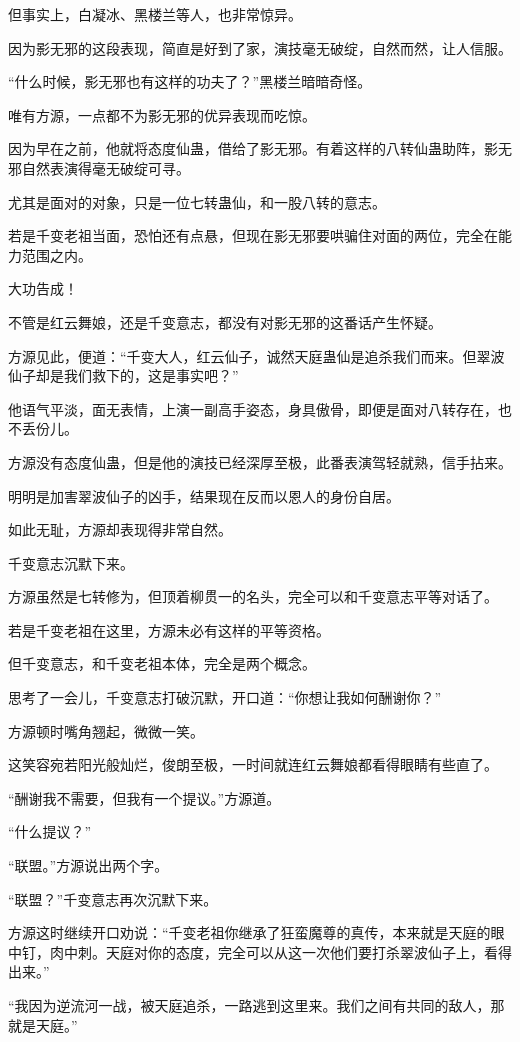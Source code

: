 \begin{this_body}
但事实上，白凝冰、黑楼兰等人，也非常惊异。

因为影无邪的这段表现，简直是好到了家，演技毫无破绽，自然而然，让人信服。

“什么时候，影无邪也有这样的功夫了？”黑楼兰暗暗奇怪。

唯有方源，一点都不为影无邪的优异表现而吃惊。

因为早在之前，他就将态度仙蛊，借给了影无邪。有着这样的八转仙蛊助阵，影无邪自然表演得毫无破绽可寻。

尤其是面对的对象，只是一位七转蛊仙，和一股八转的意志。

若是千变老祖当面，恐怕还有点悬，但现在影无邪要哄骗住对面的两位，完全在能力范围之内。

大功告成！

不管是红云舞娘，还是千变意志，都没有对影无邪的这番话产生怀疑。

方源见此，便道：“千变大人，红云仙子，诚然天庭蛊仙是追杀我们而来。但翠波仙子却是我们救下的，这是事实吧？”

他语气平淡，面无表情，上演一副高手姿态，身具傲骨，即便是面对八转存在，也不丢份儿。

方源没有态度仙蛊，但是他的演技已经深厚至极，此番表演驾轻就熟，信手拈来。

明明是加害翠波仙子的凶手，结果现在反而以恩人的身份自居。

如此无耻，方源却表现得非常自然。

千变意志沉默下来。

方源虽然是七转修为，但顶着柳贯一的名头，完全可以和千变意志平等对话了。

若是千变老祖在这里，方源未必有这样的平等资格。

但千变意志，和千变老祖本体，完全是两个概念。

思考了一会儿，千变意志打破沉默，开口道：“你想让我如何酬谢你？”

方源顿时嘴角翘起，微微一笑。

这笑容宛若阳光般灿烂，俊朗至极，一时间就连红云舞娘都看得眼睛有些直了。

“酬谢我不需要，但我有一个提议。”方源道。

“什么提议？”

“联盟。”方源说出两个字。

“联盟？”千变意志再次沉默下来。

方源这时继续开口劝说：“千变老祖你继承了狂蛮魔尊的真传，本来就是天庭的眼中钉，肉中刺。天庭对你的态度，完全可以从这一次他们要打杀翠波仙子上，看得出来。”

“我因为逆流河一战，被天庭追杀，一路逃到这里来。我们之间有共同的敌人，那就是天庭。”


\end{this_body}
